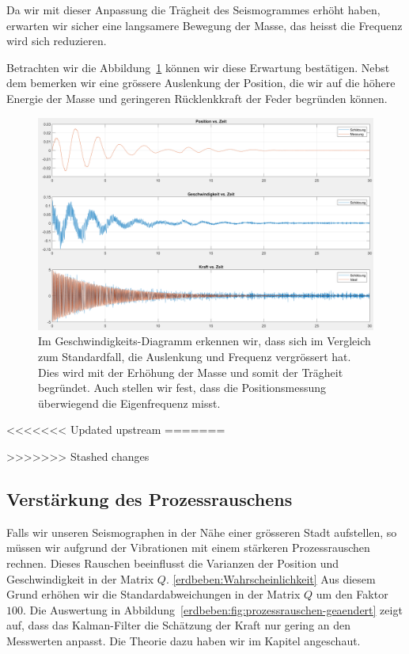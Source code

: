Da wir mit dieser Anpassung die Trägheit des Seismogrammes erhöht haben, erwarten wir sicher eine langsamere Bewegung der Masse, das heisst die Frequenz wird sich reduzieren.

Betrachten wir die Abbildung~\ref{erdbeben:fig:systemparameter-geaendert} können wir diese Erwartung bestätigen.
Nebst dem bemerken wir eine grössere Auslenkung der Position, die wir auf die höhere Energie der Masse und geringeren Rücklenkkraft der Feder begründen können.

\begin{figure}
	\begin{center}
		\includegraphics[width=\linewidth,keepaspectratio]{papers/erdbeben/Systemparameter_geaendert_2.PNG}
		\caption{Im Geschwindigkeits-Diagramm erkennen wir, dass sich im Vergleich zum Standardfall, die Auslenkung und Frequenz vergrössert hat. Dies wird mit der Erhöhung der Masse und somit der Trägheit begründet. Auch stellen wir fest, dass die Positionsmessung überwiegend die Eigenfrequenz misst.}
    \label{erdbeben:fig:systemparameter-geaendert}
	\end{center}
\end{figure}

<<<<<<< Updated upstream
=======



>>>>>>> Stashed changes
\subsection{Verstärkung des Prozessrauschens}
Falls wir unseren Seismographen in der Nähe einer grösseren Stadt aufstellen, so müssen wir aufgrund der Vibrationen mit einem stärkeren Prozessrauschen rechnen.
Dieses Rauschen beeinflusst die Varianzen der Position und Geschwindigkeit in der Matrix $Q$.
\ref{erdbeben:Wahrscheinlichkeit}
Aus diesem Grund erhöhen wir die Standardabweichungen in der Matrix $Q$ um den Faktor $100$.
Die Auswertung in Abbildung~\ref{erdbeben:fig:prozessrauschen-geaendert} zeigt auf, dass das Kalman-Filter die Schätzung der Kraft nur gering an den Messwerten anpasst.
Die Theorie dazu haben wir im Kapitel  angeschaut.

